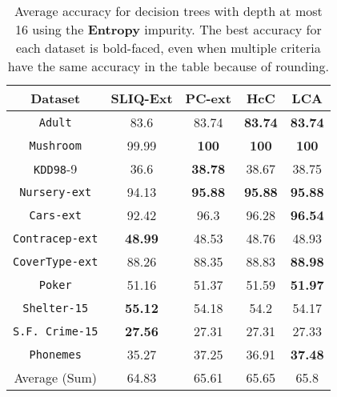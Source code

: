 \documentclass{article}
\begin{document}
\begin{table}
\small
\centering
\begin{tabular}{c|c|c|c|c} 
Dataset             &  SLIQ-Ext    & PC-ext       & HcC         & LCA        \\
\hline
{\tt Adult}         &  83.6        & 83.74        & {\bf 83.74} & {\bf 83.74}\\
{\tt Mushroom}      &  99.99       & {\bf 100 }   & {\bf 100 }  & {\bf 100}  \\
{\tt KDD98}-9       &  36.6        & {\bf 38.78}  & 38.67       & 38.75      \\
{\tt Nursery-ext}   &  94.13       & {\bf 95.88}  & {\bf 95.88} & {\bf 95.88}\\
{\tt Cars-ext}      &  92.42       & 96.3         & 96.28       & {\bf 96.54}\\
{\tt Contracep-ext} &  {\bf 48.99} & 48.53        & 48.76       & 48.93      \\
{\tt CoverType-ext} &  88.26       & 88.35        & 88.83       & {\bf 88.98}\\
{\tt Poker}         &  51.16       & 51.37        & 51.59       & {\bf 51.97}\\
{\tt Shelter-15}    &  {\bf 55.12} & 54.18        & 54.2        & 54.17      \\
{\tt S.F. Crime-15} &  {\bf 27.56} & 27.31        & 27.31       & 27.33      \\
{\tt Phonemes}      &  35.27       & 37.25        & 36.91       & {\bf 37.48}\\
\hline
Average (Sum)       &  64.83       & 65.61        & 65.65       & 65.8
\end{tabular}
\caption{Average accuracy for decision trees with depth at most 16 using the {\bf Entropy} impurity. The best accuracy for each dataset is bold-faced, even when multiple criteria have the same accuracy in the table because of rounding.}
\label{tab:nominal-16-entropy}
\end{table}
\end{document}
